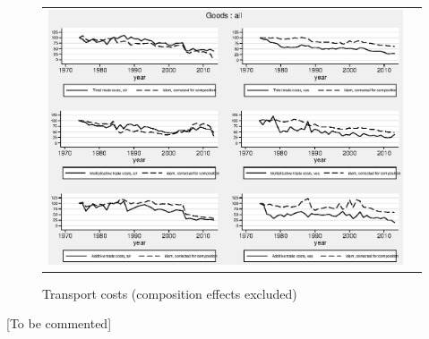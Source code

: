 \documentclass[a4paper,11pt]{article}
\begin{document}
\begin{figure}[htbp]
\caption{Transport costs (composition effects excluded)}
\label{fig:totalTC_compeffects_excl}
\begin{center}
\begin{tabular}{cc}
 \includegraphics[width=6in]{graph_composition_all.eps} \\
\end{tabular}
\end{center}
\end{figure}

[To be commented]

\end{document}
